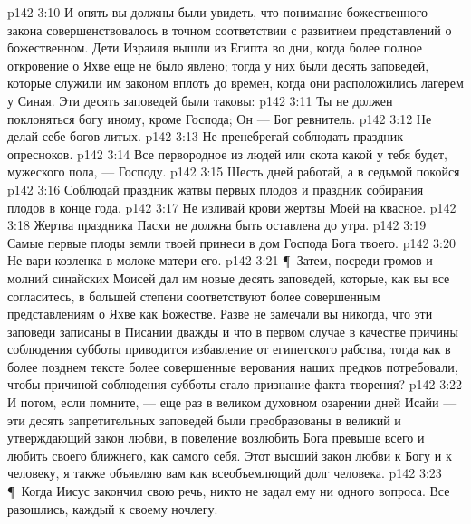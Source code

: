 \vs p142 3:10 И опять вы должны были увидеть, что понимание божественного закона совершенствовалось в точном соответствии с развитием представлений о божественном. Дети Израиля вышли из Египта во дни, когда более полное откровение о Яхве еще не было явлено; тогда у них были десять заповедей, которые служили им законом вплоть до времен, когда они расположились лагерем у Синая. Эти десять заповедей были таковы:
\vs p142 3:11 \bibnobreakspace Ты не должен поклоняться богу иному, кроме Господа; Он --- Бог ревнитель.
\vs p142 3:12 \bibnobreakspace Не делай себе богов литых.
\vs p142 3:13 \bibnobreakspace Не пренебрегай соблюдать праздник опресноков.
\vs p142 3:14 \bibnobreakspace Все первородное из людей или скота какой у тебя будет, мужеского пола, --- Господу.
\vs p142 3:15 \bibnobreakspace Шесть дней работай, а в седьмой покойся
\vs p142 3:16 \bibnobreakspace Соблюдай праздник жатвы первых плодов и праздник собирания плодов в конце года.
\vs p142 3:17 \bibnobreakspace Не изливай крови жертвы Моей на квасное.
\vs p142 3:18 \bibnobreakspace Жертва праздника Пасхи не должна быть оставлена до утра.
\vs p142 3:19 \bibnobreakspace Самые первые плоды земли твоей принеси в дом Господа Бога твоего.
\vs p142 3:20 \bibnobreakspace Не вари козленка в молоке матери его.
\vs p142 3:21 \P\ Затем, посреди громов и молний синайских Моисей дал им новые десять заповедей, которые, как вы все согласитесь, в большей степени соответствуют более совершенным представлениям о Яхве как Божестве. Разве не замечали вы никогда, что эти заповеди записаны в Писании дважды и что в первом случае в качестве причины соблюдения субботы приводится избавление от египетского рабства, тогда как в более позднем тексте более совершенные верования наших предков потребовали, чтобы причиной соблюдения субботы стало признание факта творения?
\vs p142 3:22 И потом, если помните, --- еще раз в великом духовном озарении дней Исайи --- эти десять запретительных заповедей были преобразованы в великий и утверждающий закон любви, в повеление возлюбить Бога превыше всего и любить своего ближнего, как самого себя. Этот высший закон любви к Богу и к человеку, я также объявляю вам как всеобъемлющий долг человека.
\vs p142 3:23 \P\ Когда Иисус закончил свою речь, никто не задал ему ни одного вопроса. Все разошлись, каждый к своему ночлегу.
